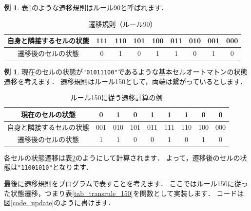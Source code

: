 \documentclass[dvipdfmx]{jsarticle}
\theoremstyle{definition}
\newtheorem{example}[definition]{例}
\begin{document}
\begin{example}
    \label{ex_transrule}
    表\ref{tab_transrule_90}のような遷移規則はルール90と呼ばれます．

    \begin{table}[ht]
    \begin{center}
    \begin{tabular}{|c||c|c|c|c|c|c|c|c|} \hline
        自身と隣接するセルの状態 & 111 & 110 & 101 & 100 & 011 & 010 & 001 & 000 \\ \hline
        遷移後のセルの状態      &  0   &  1  &  0  &  1  &  1  &  0  &  1  &  0 \\ \hline
    \end{tabular}
    \end{center}
    \caption{遷移規則（ルール90）}
    \label{tab_transrule_90}
    \end{table}
\end{example}


\begin{example}
\label{ex_update_gen}
    現在のセルの状態が\verb|"01011100"|であるような基本セルオートマトンの状態遷移を考えます．
    遷移規則はルール150として，両端は繋がっているとします．

    \begin{table}[ht]
    \begin{center}
    \begin{tabular}{|c||c|c|c|c|c|c|c|c|} \hline
        現在のセルの状態 & 0 & 1 & 0 & 1 & 1 & 1 & 0 & 0 \\ \hline
        自身と隣接するセルの状態 & 001 & 010 & 101 & 011 & 111 & 110 & 100 & 000 \\ \hline
        遷移後のセルの状態 & 1 & 1 & 0 & 0 & 1 & 0 & 1 & 0 \\ \hline
    \end{tabular}
    \end{center}
    \caption{ルール150に従う遷移計算の例}
    \label{tab_ex_update_gen}
    \end{table}

    各セルの状態遷移は表\ref{tab_ex_update_gen}のようにして計算されます．
    よって，遷移後のセルの状態は\verb|"11001010"|となります．
\end{example}


最後に遷移規則をプログラムで表すことを考えます．
ここではルール150に従った状態遷移，つまり表\ref{tab_transrule_150}を関数として実装します．
コードは図\ref{code_update}のように書けます．
\end{document}
